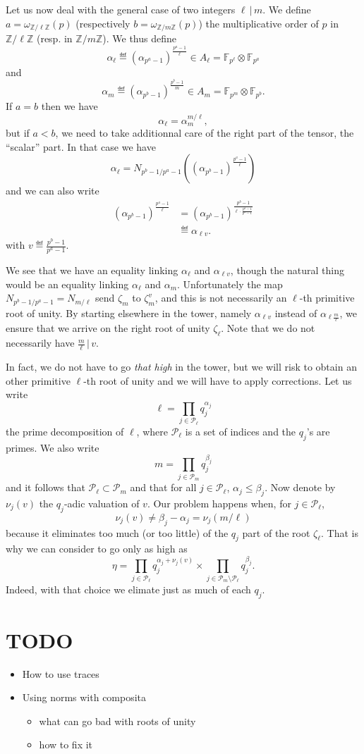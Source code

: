 \documentclass[a4paper,11pt]{article}
\begin{document}
Let us now deal with the general case of two integers $\ell\,|\,m$. We define
$a=\omega_{\mathbb{Z}/\ell\mathbb{Z}}(p)$ (respectively
$b=\omega_{\mathbb{Z}/m\mathbb{Z}}(p)$) the multiplicative order of $p$ in
$\mathbb{Z}/\ell\mathbb{Z}$ (resp. in $\mathbb{Z}/m\mathbb{Z}$). We thus define
\[
  \alpha_\ell\eqdef(\alpha_{p^a-1})^{\frac{p^a-1}{\ell}}\in A_{\ell}=\mathbb{F}_{p^\ell}\otimes \mathbb{F}_{p^a}
\]
and
\[
  \alpha_m\eqdef(\alpha_{p^b-1})^{\frac{p^{b}-1}{m}}\in A_m=\mathbb{F}_{p^m}\otimes \mathbb{F}_{p^b}.
\]
If $a=b$ then we have 
\[
  \alpha_{\ell}=\alpha_m^{m/\ell},
\]
but if $a<b$, we need to take additionnal care of the right part of the tensor,
the ``scalar'' part. In that case we have
\[
  \alpha_\ell=N_{p^b-1/p^a-1}((\alpha_{p^b-1})^{\frac{p^a-1}{\ell}})
\]
and we can also write 
\begin{align*}
  (\alpha_{p^b-1})^{\frac{p^a-1}{\ell}}&=(\alpha_{p^b-1})^{\frac{p^b-1}{\ell\cdot\frac{p^b-1}{p^a-1}}}\\
  &\eqdef \alpha_{\ell v}.
\end{align*}
with $v\eqdef\frac{p^b-1}{p^a-1}$.

We see that we have an equality linking $\alpha_\ell$ and
$\alpha_{\ell v}$, though the natural thing would be an
equality linking $\alpha_\ell$ and $\alpha_m$. Unfortunately the map
$N_{p^b-1/p^a-1}=N_{m/\ell}$ send $\zeta_{m}$ to
$\zeta_{m}^{v}$, and this is not necessarily an $\ell$-th primitive root of unity.
By starting elsewhere in the tower, namely $\alpha_{\ell v}$ instead of
$\alpha_{\ell \frac{m}{\ell}}$, we ensure that we arrive on the right root of
unity $\zeta_{\ell}$. Note that we do not necessarily have
$\frac{m}{\ell}\,|\,v$.

In fact, we do not have to go \emph{that high} in the tower, but we will risk to
obtain an other primitive $\ell$-th root of unity and we will have to apply
corrections. Let us write
\[
  \ell=\prod_{j\in\mathcal P_\ell}q_j^{\alpha_j}
\]
the prime decomposition of $\ell$, where $\mathcal P_\ell$ is a set of indices
and the $q_j$'s are primes. We also write
\[
  m=\prod_{j\in\mathcal P_m}q_j^{\beta_j}
\]
and it follows that $\mathcal P_\ell\subset\mathcal P_m$ and that for all
$j\in\mathcal P_\ell$, $\alpha_j\leq\beta_j$. Now denote by $\nu_j(v)$ the
$q_j$-adic valuation of $v$. Our problem happens when, for $j\in\mathcal
P_\ell$,
\[
  \nu_j(v)\neq \beta_j-\alpha_j=\nu_j(m/\ell)
\]
because it eliminates too much (or too little) of the $q_j$ part of the root $\zeta_\ell$. That
is why we can consider to go only as high as 
\[
  \eta=\prod_{j\in\mathcal
  P_\ell}q_j^{\alpha_j+\nu_j(v)}\times\prod_{j\in\mathcal P_m\setminus \mathcal
  P_\ell}q_j^{\beta_j}.
\]
Indeed, with that choice we elimate just as much of each $q_j$.

\section{TODO}
\begin{itemize}
  \item How to use traces
  \item Using norms with composita
    \begin{itemize}
      \item what can go bad with roots of unity
      \item how to fix it
    \end{itemize}
\end{itemize}
\end{document}
